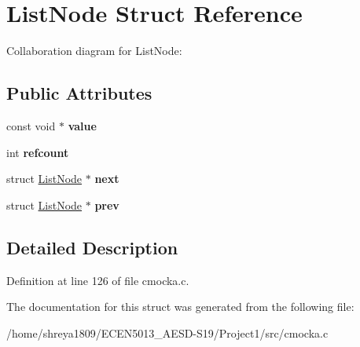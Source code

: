 \hypertarget{structListNode}{}\section{List\+Node Struct Reference}
\label{structListNode}


Collaboration diagram for List\+Node\+:
\subsection*{Public Attributes}
\begin{DoxyCompactItemize}
\item 
\mbox{\label{structListNode_a048e935049ce14b34caab57c975a9ace}} 
const void $\ast$ {\bfseries value}
\item 
\mbox{\label{structListNode_a4b3cd4e8c0dab91f5a07978b50d63b38}} 
int {\bfseries refcount}
\item 
\mbox{\label{structListNode_ac7af9e18e0586f13d59a52b3501ac4ca}} 
struct \hyperlink{structListNode}{List\+Node} $\ast$ {\bfseries next}
\item 
\mbox{\label{structListNode_ac29aefb7627ded4e29dcb96b7a47f3f2}} 
struct \hyperlink{structListNode}{List\+Node} $\ast$ {\bfseries prev}
\end{DoxyCompactItemize}


\subsection{Detailed Description}


Definition at line 126 of file cmocka.\+c.



The documentation for this struct was generated from the following file\+:\begin{DoxyCompactItemize}
\item 
/home/shreya1809/\+E\+C\+E\+N5013\+\_\+\+A\+E\+S\+D-\/\+S19/\+Project1/src/cmocka.\+c\end{DoxyCompactItemize}
